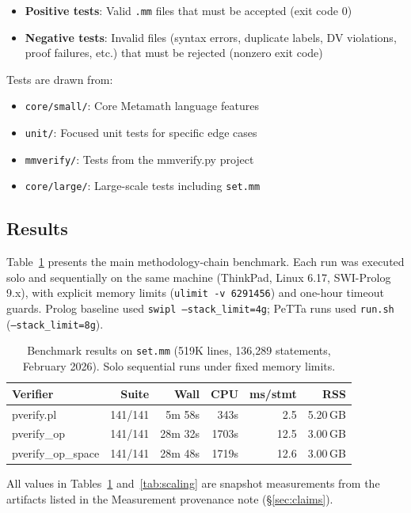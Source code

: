 \documentclass[11pt]{article}
\begin{document}
\begin{itemize}[leftmargin=2em]
  \item \textbf{Positive tests}: Valid \texttt{.mm} files that must
    be accepted (exit code 0)
  \item \textbf{Negative tests}: Invalid files (syntax errors,
    duplicate labels, DV violations, proof failures, etc.) that
    must be rejected (nonzero exit code)
\end{itemize}

Tests are drawn from:
\begin{itemize}[leftmargin=2em]
  \item \texttt{core/small/}: Core Metamath language features
  \item \texttt{unit/}: Focused unit tests for specific edge cases
  \item \texttt{mmverify/}: Tests from the mmverify.py project
  \item \texttt{core/large/}: Large-scale tests including
    \texttt{set.mm}
\end{itemize}

\subsection{Results}

Table~\ref{tab:results} presents the main methodology-chain benchmark.
Each run was executed solo and sequentially on the same machine
(ThinkPad, Linux 6.17, SWI-Prolog 9.x), with explicit memory limits
(\texttt{ulimit -v 6291456}) and one-hour timeout guards.
Prolog baseline used \texttt{swipl --stack\_limit=4g}; PeTTa runs used
\texttt{run.sh} (\texttt{--stack\_limit=8g}).

\begin{table}[ht]
\centering
\caption{Benchmark results on \texttt{set.mm}
  (519K lines, 136{,}289 statements, February 2026).
  Solo sequential runs under fixed memory limits.}
\label{tab:results}
\begin{tabular}{lrrrrr}
\toprule
\textbf{Verifier} & \textbf{Suite} & \textbf{Wall} & \textbf{CPU} & \textbf{ms/stmt} & \textbf{RSS} \\
\midrule
pverify.pl         & 141/141 & 5m 58s  & 343s  & 2.5  & 5.20\,GB \\
pverify\_op        & 141/141 & 28m 32s & 1703s & 12.5 & 3.00\,GB \\
pverify\_op\_space & 141/141 & 28m 48s & 1719s & 12.6 & 3.00\,GB \\
\bottomrule
\end{tabular}
\end{table}
All values in Tables~\ref{tab:results} and~\ref{tab:scaling} are snapshot
measurements from the artifacts listed in the Measurement provenance note
(\S\ref{sec:claims}).
\end{document}
